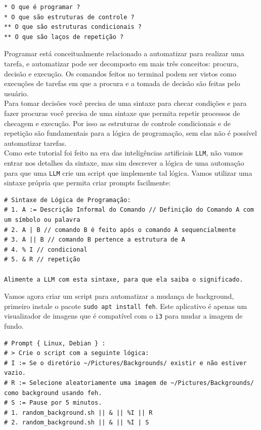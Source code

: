 \documentclass[12pt,a4paper]{article}
\begin{document}
\begin{lstlisting}
* O que é programar ? 
* O que são estruturas de controle ?
** O que são estruturas condicionais ?
** O que são laços de repetição ?
\end{lstlisting}

\vspace{\baselineskip}

Programar está conceitualmente relacionado a automatizar para realizar uma tarefa, e automatizar pode ser decomposto em mais três conceitos: procura, decisão e execução. Os comandos feitos no terminal podem ser vistos como execuções de tarefas em que a procura e a tomada de decisão são feitas pelo usuário.\\

Para tomar decisões você precisa de uma sintaxe para checar condições e para fazer procuras você precisa de uma sintaxe que permita repetir processos de checagem e execução. Por isso as estruturas de controle condicionais e de repetição são fundamentais para a lógica de programação, sem elas não é possível automatizar tarefas. \\

Como este tutorial foi feito na era das inteligências artificiais \texttt{LLM}, não vamos entrar nos detalhes da sintaxe, mas sim descrever a lógica de uma automação para que uma \texttt{LLM} crie um script que implemente tal lógica. Vamos utilizar uma sintaxe própria que permita criar prompts facilmente: \\

\begin{lstlisting}
# Sintaxe de Lógica de Programação:
# 1. A := Descrição Informal do Comando // Definição do Comando A com um símbolo ou palavra
# 2. A | B // comando B é feito após o comando A sequencialmente
# 3. A || B // comando B pertence a estrutura de A 
# 4. % I // condicional 
# 5. & R // repetição 

Alimente a LLM com esta sintaxe, para que ela saiba o significado. 
\end{lstlisting}

\vspace{\baselineskip}

Vamos agora criar um script para automatizar a mudança de background, primeiro instale o pacote \texttt{sudo apt install feh}. Este aplicativo é apenas um visualizador de imagens que é compatível com o \texttt{i3} para mudar a imagem de fundo. \\

\begin{lstlisting}
# Prompt { Linux, Debian } :
# > Crie o script com a seguinte lógica:
# I := Se o diretório ~/Pictures/Backgrounds/ existir e não estiver vazio.
# R := Selecione aleatoriamente uma imagem de ~/Pictures/Backgrounds/ como background usando feh.
# S := Pause por 5 minutos.
# 1. random_background.sh || & || %I || R 
# 2. random_background.sh || & || %I | S 
\end{lstlisting}
\end{document}
